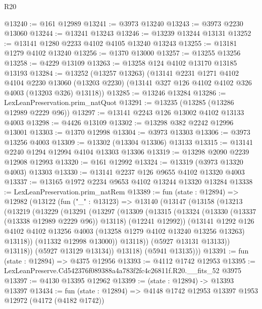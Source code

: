 \begin{lexlean}{R20}
\begin{coremodule}
@13240 := @161 @12989
@13241 := @3973 @13240
@13243 := @3973 @2230 @13060
@13244 := @13241 @13243
@13246 := @13239 @13244 @13131
@13252 := @13141 @1280 @2233 @4102 @4105 @13240 @13243
@13255 := @13181 @1279 @4102 @13240
@13256 := @1370 @13000
@13257 := @13255 @13256
@13258 := @4229 @13109
@13263 := @13258 @124 @4102 @13170 @13185 @13193
@13284 := @13252
    (@13257 @13263)
    (@13141
      @2231
      @1271
      @4102
      @4104
      @2230
      @13060
      (@13203 @2230)
      (@13141 @327 @126 @4102 @4102 @326 @4003 (@13203 @326) @13118))
@13285 := @13246 @13284
@13286 := LexLeanPreservation.prim_natQuot
@13291 := @13235 (@13285 (@13286 @12989 @2229 @96))
@13297 := @13141 @2243 @126 @13002 @4102 @13133 @4003
@13298 := @4426 @13109
@13302 := @13298 @382 @2242 @12996 @13001
@13303 := @1370 @12998
@13304 := @3973 @13303
@13306 := @3973 @13256 @4003
@13309 := @13302 (@13304 @13306) @13133
@13315 := @13141 @2240 @1294 @12994 @4104 @13303 @13306
@13319 := @13298 @2090 @2239 @12908 @12993
@13320 := @161 @12992
@13324 := @13319 (@3973 @13320 @4003) @13303
@13330 := @13141 @2237 @126 @9655 @4102 @13320 @4003
@13337 := @13165 @1972 @2234 @9653 @4102 @13244 @13320 @13284
@13338 := LexLeanPreservation.prim_natRem
@13389 := fun (state : @12894) =>
  @12982
    (@13122
      (fun ("_" : @13123) =>
      @13140
        (@13147
          (@13158
            (@13213
              (@13219
                (@13229
                  (@13291
                    (@13297
                      (@13309
                        (@13315
                          (@13324
                            (@13330 (@13337 (@13338 @12989 @2229 @96)) @13118)
                            (@12241 @12992))
                          (@13141
                            @1292
                            @126
                            @4102
                            @4102
                            @13256
                            @4003
                            (@13258 @1279 @4102 @13240 @13256 @13263)
                            @13118))
                        (@11332 @12998 @13000))
                      @13118))
                  (@5927 @13131 @13133))
                @13118))
            (@5927 @13129 @13134))
          @13118)
        (@5941 @13135)))
@13391 := fun (state : @12894) => @4375 @12956
@13393 := @4112 @1742 @12953
@13395 := LexLeanPreserve.Cd542376f089388a4a783f2fc4c26811f.R20.__fits_52 @3975
@13397 := @4130 @13395 @12962
@13399 := (state : @12894) -> @13393 @13397
@13434 := fun (state : @12894) =>
  @4148
    @1742
    @12953
    @13397
    @1953
    @12972
    (@4172 (@4182 @1742))

\end{coremodule}
\end{lexlean}
